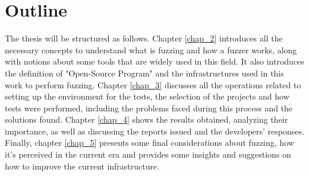 \section{Outline}
The thesis will be structured as follows.
\newline
Chapter \ref{chap_2} introduces all the necessary concepts to understand what is fuzzing and how a fuzzer works, along with notions about some tools that are widely used in this field. It also introduces the definition of "Open-Source Program" and the infrastructures used in this work to perform fuzzing.
\newline
Chapter \ref{chap_3} discusses all the operations related to setting up the environment for the tests, the selection of the projects and how tests were performed, including the problems faced during this process and the solutions found.
\newline
Chapter \ref{chap_4} shows the results obtained, analyzing their importance, as well as discussing the reports issued and the developers' responses.
\newline
Finally, chapter \ref{chap_5} presents some final considerations about fuzzing, how it's perceived in the current era and provides some insights and suggestions on how to improve the current infrastructure.

